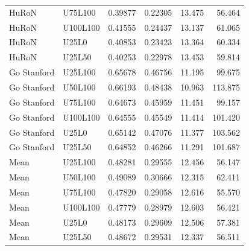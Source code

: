 \begin{table}[t]
\begin{tabular}{llrrrr}
HuRoN & U75L100 & 0.39877 & 0.22305 & 13.475 & 56.464 \\
HuRoN & U100L100 & 0.41555 & 0.24437 & 13.137 & 61.065 \\
HuRoN & U25L0 & 0.40853 & 0.23423 & 13.364 & 60.334 \\
HuRoN & U25L50 & 0.40253 & 0.22978 & 13.453 & 59.814 \\
\midrule
Go Stanford & U25L100 & 0.65678 & 0.46756 & 11.195 & 99.675 \\
Go Stanford & U50L100 & 0.66193 & 0.48438 & 10.963 & 113.875 \\
Go Stanford & U75L100 & 0.64673 & 0.45959 & 11.451 & 99.157 \\
Go Stanford & U100L100 & 0.64555 & 0.45549 & 11.414 & 101.420 \\
Go Stanford & U25L0 & 0.65142 & 0.47076 & 11.377 & 103.562 \\
Go Stanford & U25L50 & 0.64852 & 0.46266 & 11.291 & 101.687 \\
\midrule
Mean & U25L100 & 0.48281 & 0.29555 & 12.456 & 56.147 \\
Mean & U50L100 & 0.49089 & 0.30666 & 12.315 & 62.411 \\
Mean & U75L100 & 0.47820 & 0.29058 & 12.616 & 55.570 \\
Mean & U100L100 & 0.47779 & 0.28979 & 12.603 & 56.421 \\
Mean & U25L0 & 0.48173 & 0.29609 & 12.506 & 57.381 \\
Mean & U25L50 & 0.48672 & 0.29531 & 12.337 & 56.511 \\
\bottomrule
\end{tabular}
\end{table}
